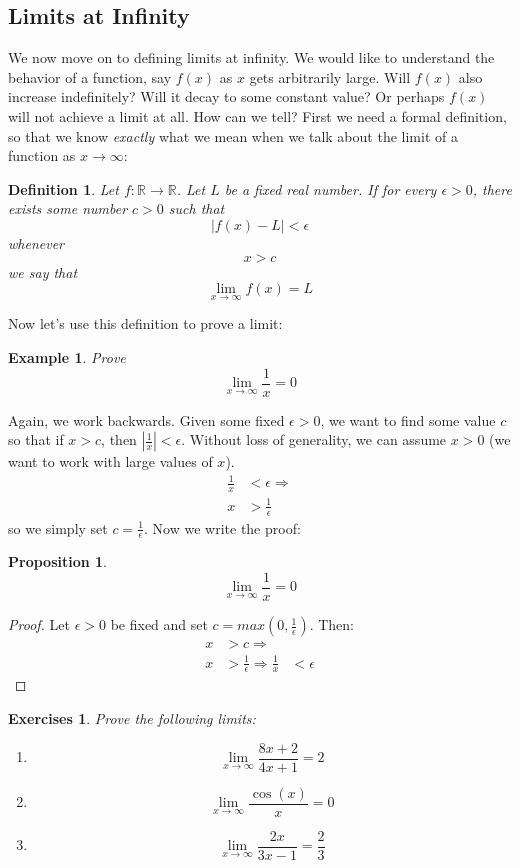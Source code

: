 \documentclass[12pt,a4paper]{article} %
\newtheorem{defn}{Definition}
\newtheorem{example}{Example}
\newtheorem{prop}{Proposition}
\newtheorem{exer}{Exercises}
\begin{document}
\subsection{Limits at Infinity}
We now move on to defining limits at infinity.  We would like to understand the behavior of a function, say $f(x)$ as $x$ gets arbitrarily large.  Will $f(x)$ also increase indefinitely?  Will it decay to some constant value?  Or perhaps $f(x)$ will not achieve a limit at all.  How can we tell?  First we need a formal definition, so that we know \emph{exactly} what we mean when we talk about the limit of a function as $x\rightarrow\infty$:
\begin{defn}
Let $f:\mathbb{R}\rightarrow\mathbb{R}$. Let $L$ be a fixed real number.  If for every $\epsilon >0$, there exists some number $c>0$ such that
\begin{equation*}
|f(x) - L|<\epsilon 
\end{equation*}
whenever
\begin{equation*}
x>c 
\end{equation*}
we say that
\begin{equation*}
\lim_{x\rightarrow \infty} f(x) = L
\end{equation*}
\end{defn}
Now let's use this definition to prove a limit:
\begin{example}
Prove $$\lim_{x\rightarrow\infty} \frac{1}{x} = 0$$
\end{example}
Again, we work backwards.  Given some fixed $\epsilon>0$, we want to find some value $c$ so that if $x>c$, then $|\frac{1}{x}|<\epsilon$.  Without loss of generality, we can assume $x>0$ (we want to work with large values of $x$).  
\begin{eqnarray*}
\frac{1}{x}&<\epsilon \Rightarrow\\
x&>\frac{1}{\epsilon}
\end{eqnarray*}
so we simply set $c=\frac{1}{\epsilon}$.  Now we write the proof:
\begin{prop}
$$\lim_{x\rightarrow\infty} \frac{1}{x} = 0$$
\end{prop}
\begin{proof}
Let $\epsilon>0$ be fixed and set $c=max(0,\frac{1}{\epsilon})$.  Then:
\begin{eqnarray*}
x&>c\Rightarrow\\
x&>\frac{1}{\epsilon}\Rightarrow
\frac{1}{x}&<\epsilon
\end{eqnarray*}
\end{proof}
\begin{exer}
Prove the following limits:
\begin{enumerate}
\item $$\lim_{x\rightarrow\infty} \frac{8x+2}{4x+1} = 2$$
\item $$\lim_{x\rightarrow\infty} \frac{\cos(x)}{x} = 0$$
\item $$\lim_{x\rightarrow\infty} \frac{2x}{3x-1} = \frac23$$
\end{enumerate}
\end{exer}
\end{document}

